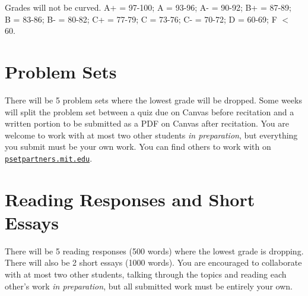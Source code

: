 \documentclass[letterpaper]{infinity_syllabus} %
\begin{document}
\begin{twentyshort}
\end{twentyshort}

Grades will not be curved.
A+ = 97-100; A = 93-96; A- = 90-92; B+ = 87-89;\\ 
B = 83-86; B- = 80-82; C+ = 77-79; C = 73-76; C- = 70-72; D = 60-69; F $<$ 60.


\vspace{0.5cm}
\section{Problem Sets}

There will be 5 problem sets where the lowest grade will be dropped.
Some weeks will split the problem set between a quiz due on Canvas before recitation and a written portion to be submitted as a PDF on Canvas after recitation.
You are welcome to work with at most two other students \textit{in preparation}, but everything you submit must be your own work.
You can find others to work with on \href{psetpartners.mit.edu}{\texttt{psetpartners.mit.edu}}.

\vspace{0.5cm}
\section{Reading Responses and Short Essays}

There will be 5 reading responses (500 words) where the lowest grade is dropping. 
There will also be 2 short essays (1000 words).
You are encouraged to collaborate with at most two other students, talking through the topics and reading each other's work \textit{in preparation}, but all submitted work must be entirely your own.
\end{document}

